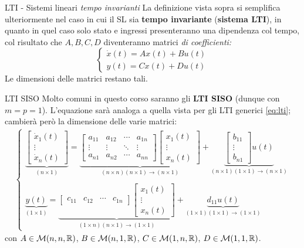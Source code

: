 \documentclass[a4paper]{report}
\begin{document}
\begin{defin}{LTI - Sistemi lineari \textit{tempo invarianti}}{}
	La definizione vista sopra si semplifica ulteriormente nel caso in cui il SL sia \textbf{tempo invariante} (\textbf{sistema LTI}), in quanto in quel caso solo stato e ingressi presenteranno una dipendenza col tempo, col risultato che $A,B,C,D$ diventeranno matrici \textit{di coefficienti:}
\begin{equation}
\label{eq:lti}
		\begin{cases}
			\dot x(t) = Ax(t) + Bu(t) \\
			y(t) = Cx(t) + Du(t)
		\end{cases}
\end{equation}
Le dimensioni delle matrici restano tali.
\end{defin}
\begin{defin}{LTI SISO}{}
Molto comuni in questo corso saranno gli \textbf{LTI SISO} (dunque con $m=p=1$). L'equazione sarà analoga a quella vista per gli LTI generici \eqref{eq:lti}; cambierà però la dimensione delle varie matrici:
\begin{align*}
\begin{cases}
\underbrace{\begin{bmatrix}
			\dot x_1(t) \\
			\vdots \\
			\dot x_n(t)
		\end{bmatrix}}_{(n\times 1)} = 
		\underbrace{\begin{bmatrix}
			a_{11} & a_{12} & \cdots &a_{1n} \\
			\vdots & \vdots & \ddots & \vdots \\
			a_{n1} & a_{n2} & \cdots &a_{nn}
		\end{bmatrix} \begin{bmatrix}
			x_1(t) \\ \vdots \\ x_n(t)
		\end{bmatrix}}_{(n \times n)(n\times 1) \rightarrow (n\times 1)} + \underbrace{\begin{bmatrix}
			b_{11} \\ \vdots \\ b_{n1} 
		\end{bmatrix} u(t)}_{(n \times 1)(1\times 1) \rightarrow (n\times 1)}
\\
\\
		\underbrace{
			y(t)}_{(1\times 1)} = 
		\underbrace{\begin{bmatrix}
			c_{11} & c_{12} & \cdots &c_{1n}
		\end{bmatrix} \begin{bmatrix}
			x_1(t) \\ \vdots \\ x_n(t)
		\end{bmatrix}}_{(1 \times n)(n\times 1) \rightarrow (1\times 1)} + \underbrace{
			d_{11} u(t)}_{(1 \times 1)(1\times 1) \rightarrow (1\times 1)}
\end{cases}
\end{align*}
con $A \in \mathcal{M}(n,n, \mathbb{R})$, $B \in \mathcal{M}(n,1, \mathbb{R})$, $C \in \mathcal{M}(1,n, \mathbb{R})$, $D \in \mathcal{M}(1,1, \mathbb{R})$.
\end{defin}
\end{document}
